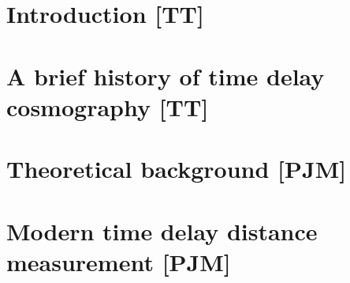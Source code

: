 
\section{Introduction [TT]}
\label{sec:intro}




\section{A brief history of time delay cosmography [TT]}
\label{sec:history}









\section{Theoretical background [PJM]}
\label{sec:theory}




\section{Modern time delay distance measurement [PJM]}
\label{sec:measurement}



